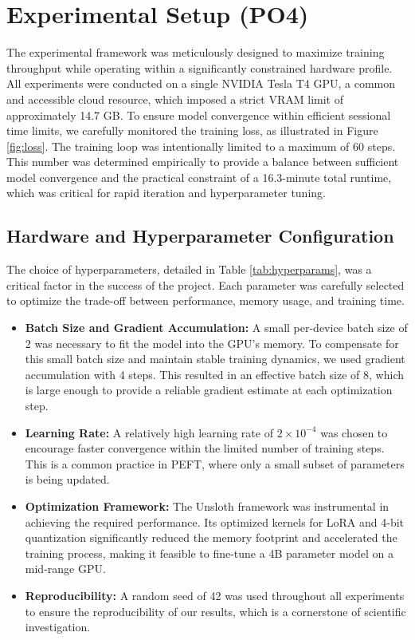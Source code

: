\documentclass[11pt]{article}
\begin{document}
\section{Experimental Setup (PO4)}
The experimental framework was meticulously designed to maximize training throughput while operating within a significantly constrained hardware profile. All experiments were conducted on a single NVIDIA Tesla T4 GPU, a common and accessible cloud resource, which imposed a strict VRAM limit of approximately 14.7 GB. To ensure model convergence within efficient sessional time limits, we carefully monitored the training loss, as illustrated in Figure \ref{fig:loss}. The training loop was intentionally limited to a maximum of 60 steps. This number was determined empirically to provide a balance between sufficient model convergence and the practical constraint of a 16.3-minute total runtime, which was critical for rapid iteration and hyperparameter tuning.

\subsection{Hardware and Hyperparameter Configuration}
The choice of hyperparameters, detailed in Table \ref{tab:hyperparams}, was a critical factor in the success of the project. Each parameter was carefully selected to optimize the trade-off between performance, memory usage, and training time.
\begin{itemize}
    \item \textbf{Batch Size and Gradient Accumulation:} A small per-device batch size of 2 was necessary to fit the model into the GPU's memory. To compensate for this small batch size and maintain stable training dynamics, we used gradient accumulation with 4 steps. This resulted in an effective batch size of 8, which is large enough to provide a reliable gradient estimate at each optimization step.
    \item \textbf{Learning Rate:} A relatively high learning rate of $2 \times 10^{-4}$ was chosen to encourage faster convergence within the limited number of training steps. This is a common practice in PEFT, where only a small subset of parameters is being updated.
    \item \textbf{Optimization Framework:} The Unsloth framework was instrumental in achieving the required performance. Its optimized kernels for LoRA and 4-bit quantization significantly reduced the memory footprint and accelerated the training process, making it feasible to fine-tune a 4B parameter model on a mid-range GPU.
    \item \textbf{Reproducibility:} A random seed of 42 was used throughout all experiments to ensure the reproducibility of our results, which is a cornerstone of scientific investigation.
\end{itemize}
\end{document}
